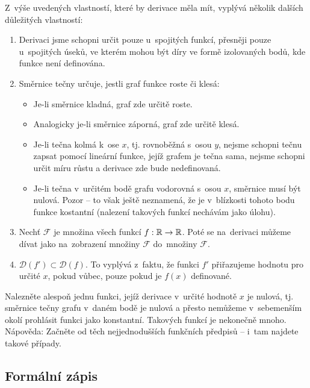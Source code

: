 Z~výše uvedených vlastností, které by derivace měla mít, vyplývá několik dalších
důležitých vlastností:
\begin{enumerate}
    \item Derivaci jsme schopni určit pouze u~spojitých funkcí, přesněji pouze
    u~spojitých úseků, ve kterém mohou být díry ve formě izolovaných bodů, kde
    funkce není definována.
    \item Směrnice tečny určuje, jestli graf funkce roste či klesá:
    \begin{itemize}
        \item Je-li směrnice kladná, graf zde určitě roste.
        \item Analogicky je-li směrnice záporná, graf zde určitě klesá.
        \item Je-li tečna kolmá k~ose $x$, tj. rovnoběžná s~osou $y$, nejsme
        schopni tečnu zapsat pomocí lineární funkce, jejíž grafem je tečna
        sama, nejsme schopni určit míru růstu a derivace zde bude nedefinovaná.
        \item Je-li tečna v~určitém bodě grafu vodorovná s~osou $x$, směrnice
        musí být nulová. Pozor -- to však ještě neznamená, že je v~blízkosti
        tohoto bodu funkce kostantní (nalezení takových funkcí nechávám jako
        úlohu).
    \end{itemize}
    \item Nechť $\mathcal{F}$ je množina všech funkcí $f: \mathbb{R} \to \mathbb{R}$.
    Poté se na~derivaci můžeme dívat jako na~zobrazení množiny $\mathcal{F}$
    do~množiny $\mathcal{F}$.
    \item $\mathcal{D}(f') \subset \mathcal{D}(f)$. To vyplývá z~faktu, že funkci
    $f'$ přiřazujeme hodnotu pro určité $x$, pokud vůbec, pouze pokud je $f(x)$
    definované.
\end{enumerate}

\begin{exercise}
    Nalezněte alespoň jednu funkci, jejíž derivace v~určité hodnotě $x$ je nulová,
    tj. směrnice tečny grafu v~daném bodě je nulová a přesto nemůžeme v~sebemenším
    okolí prohlásit funkci jako konstantní. Takových funkcí je nekonečně mnoho.
    Nápověda: Začněte od těch nejjednodušších funkčních předpisů -- i~tam najdete
    takové případy.
\end{exercise}

\subsection{Formální zápis}

